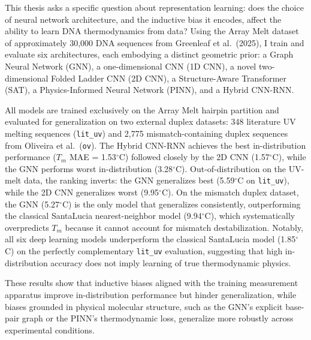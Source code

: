 \documentclass[12pt,oneside,letterpaper]{report}
\begin{document}
This thesis asks a specific question about representation learning: does the choice of neural network architecture, and the inductive bias it encodes, affect the ability to learn DNA thermodynamics from data? Using the Array Melt dataset of approximately 30,000 DNA sequences from Greenleaf et al.\ (2025), I train and evaluate six architectures, each embodying a distinct geometric prior: a Graph Neural Network (GNN), a one-dimensional CNN (1D CNN), a novel two-dimensional Folded Ladder CNN (2D CNN), a Structure-Aware Transformer (SAT), a Physics-Informed Neural Network (PINN), and a Hybrid CNN-RNN.

All models are trained exclusively on the Array Melt hairpin partition and evaluated for generalization on two external duplex datasets: 348 literature UV melting sequences (\texttt{lit\_uv}) and 2,775 mismatch-containing duplex sequences from Oliveira et al.\ (\texttt{ov}). The Hybrid CNN-RNN achieves the best in-distribution performance ($T_m$ MAE = 1.53$^\circ$C) followed closely by the 2D CNN (1.57$^\circ$C), while the GNN performs worst in-distribution (3.28$^\circ$C). Out-of-distribution on the UV-melt data, the ranking inverts: the GNN generalizes best (5.59$^\circ$C on \texttt{lit\_uv}), while the 2D CNN generalizes worst (9.95$^\circ$C). On the mismatch duplex dataset, the GNN (5.27$^\circ$C) is the only model that generalizes consistently, outperforming the classical SantaLucia nearest-neighbor model (9.94$^\circ$C), which systematically overpredicts $T_m$ because it cannot account for mismatch destabilization. Notably, all six deep learning models underperform the classical SantaLucia model (1.85$^\circ$C) on the perfectly complementary \texttt{lit\_uv} evaluation, suggesting that high in-distribution accuracy does not imply learning of true thermodynamic physics.

These results show that inductive biases aligned with the training measurement apparatus improve in-distribution performance but hinder generalization, while biases grounded in physical molecular structure, such as the GNN's explicit base-pair graph or the PINN's thermodynamic loss, generalize more robustly across experimental conditions.

\clearpage

\begin{singlespace}
\tableofcontents
\clearpage
\listoffigures
\clearpage
\listoftables
\end{singlespace}
\clearpage

\setcounter{page}{1}
\end{document}
